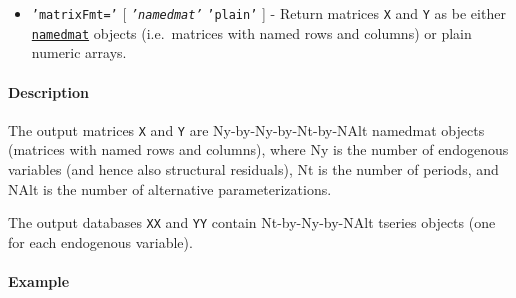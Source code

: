 \begin{itemize}
\itemsep1pt\parskip0pt
\item
  \texttt{'matrixFmt='} {[} \emph{\texttt{'namedmat'}} \textbar{}
  \texttt{'plain'} {]} - Return matrices \texttt{X} and \texttt{Y} as be
  either \href{namedmat/Contents}{\texttt{namedmat}} objects
  (i.e.~matrices with named rows and columns) or plain numeric arrays.
\end{itemize}

\paragraph{Description}\label{description}

The output matrices \texttt{X} and \texttt{Y} are Ny-by-Ny-by-Nt-by-NAlt
namedmat objects (matrices with named rows and columns), where Ny is the
number of endogenous variables (and hence also structural residuals), Nt
is the number of periods, and NAlt is the number of alternative
parameterizations.

The output databases \texttt{XX} and \texttt{YY} contain
Nt-by-Ny-by-NAlt tseries objects (one for each endogenous variable).

\paragraph{Example}\label{example}


